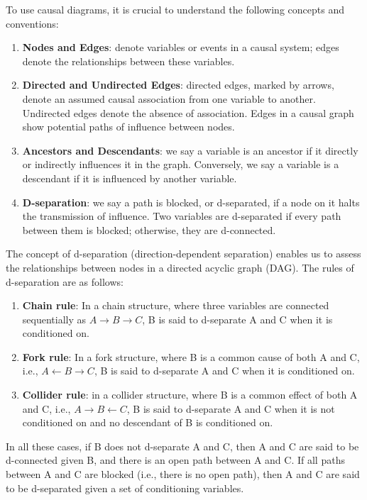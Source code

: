 \documentclass[
  singlecolumn]{report}
\begin{document}
To use causal diagrams, it is crucial to understand the following
concepts and conventions:

\begin{enumerate}
\def\labelenumi{\arabic{enumi}.}
\item
  \textbf{Nodes and Edges}: denote variables or events in a causal
  system; edges denote the relationships between these variables.
\item
  \textbf{Directed and Undirected Edges}: directed edges, marked by
  arrows, denote an assumed causal association from one variable to
  another. Undirected edges denote the absence of association. Edges in
  a causal graph show potential paths of influence between nodes.
\item
  \textbf{Ancestors and Descendants}: we say a variable is an ancestor
  if it directly or indirectly influences it in the graph. Conversely,
  we say a variable is a descendant if it is influenced by another
  variable.
\item
  \textbf{D-separation}: we say a path is blocked, or d-separated, if a
  node on it halts the transmission of influence. Two variables are
  d-separated if every path between them is blocked; otherwise, they are
  d-connected.
\end{enumerate}

The concept of d-separation (direction-dependent separation) enables us
to assess the relationships between nodes in a directed acyclic graph
(DAG). The rules of d-separation are as follows:

\begin{enumerate}
\def\labelenumi{\alph{enumi}.}
\item
  \textbf{Chain rule}: In a chain structure, where three variables are
  connected sequentially as \(A \rightarrow B \rightarrow C\), B is said
  to d-separate A and C when it is conditioned on.
\item
  \textbf{Fork rule}: In a fork structure, where B is a common cause of
  both A and C, i.e., \(A \leftarrow B \rightarrow C\), B is said to
  d-separate A and C when it is conditioned on.
\item
  \textbf{Collider rule}: in a collider structure, where B is a common
  effect of both A and C, i.e., \(A \rightarrow B \leftarrow C\), B is
  said to d-separate A and C when it is not conditioned on and no
  descendant of B is conditioned on.
\end{enumerate}

In all these cases, if B does not d-separate A and C, then A and C are
said to be d-connected given B, and there is an open path between A and
C. If all paths between A and C are blocked (i.e., there is no open
path), then A and C are said to be d-separated given a set of
conditioning variables.
\end{document}
